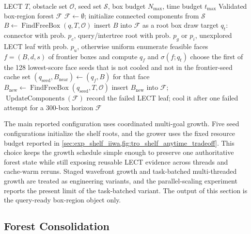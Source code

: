 \documentclass[journal]{IEEEtran}
\newcommand{\calO}{\ensuremath{\mathcal{O}}}
\newcommand{\procname}[1]{\operatorname{#1}}
\begin{document}
\begin{algorithm}[t]
\caption{GrowForest: budgeted expansion of a connected box-region forest.}
\label{alg:forest_growth}
\footnotesize
\begin{algorithmic}[1]
\REQUIRE LECT $T$, obstacle set $\calO$, seed set $\mathcal{S}$, box budget $N_{\max}$, time budget $t_{\max}$
\ENSURE Validated box-region forest $\mathcal{F}$
\STATE $\mathcal{F} \gets \emptyset$; initialize connected components from $\mathcal{S}$
  \STATE $B \gets \procname{FindFreeBox}(q, T, \calO)$
    \STATE insert $B$ into $\mathcal{F}$ as a root box
  \ENDIF
\ENDFOR
{}
  \STATE draw target $q_t$: connector with prob. $p_c$, query/intertree root with prob. $p_g$ or $p_i$, unexplored LECT leaf with prob. $p_u$, otherwise uniform
  \STATE enumerate feasible faces $f=(B,d,s)$ of frontier boxes and compute $q_f$ and $\sigma(f;q_t)$
  \STATE choose the first of the 128 lowest-score face seeds that is not cooled and not in the frontier-seed cache
  \STATE set $(q_{\mathrm{seed}},B_{\mathrm{near}}) \gets (q_f,B)$ for that face
  \STATE $B_{\mathrm{new}} \gets \procname{FindFreeBox}(q_{\mathrm{seed}}, T, \calO)$
  \IF{$B_{\mathrm{new}} \neq \emptyset$ and $\procname{BoxesConnected}(B_{\mathrm{new}},B_{\mathrm{near}},\tau)$}
    \STATE insert $B_{\mathrm{new}}$ into $\mathcal{F}$; $\procname{UpdateComponents}(\mathcal{F})$
  \ELSE
    \STATE record the failed LECT leaf; cool it after one failed attempt for a 300-box horizon
  \ENDIF
\ENDWHILE
\RETURN $\mathcal{F}$
\end{algorithmic}
\end{algorithm}

The main reported configuration uses coordinated multi-goal growth. Five seed
configurations initialize the shelf roots, and the grower uses the fixed
resource budget reported in
\cref{sec:exp_shelf_iiwa,fig:tro_shelf_anytime_tradeoff}. This choice keeps the
growth schedule simple enough to preserve one authoritative forest state while
still exposing reusable LECT evidence across threads and cache-warm reruns.
Staged wavefront growth and task-batched multi-threaded growth are treated as
engineering variants, and the parallel-scaling experiment reports the present
limit of the task-batched variant. The output of this section is the
query-ready box-region object only.

\subsection{Forest Consolidation}\label{sec:forest_consolidation}
\end{document}

